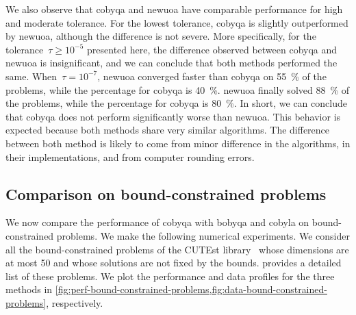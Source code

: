 We also observe that \gls{cobyqa} and \gls{newuoa} have comparable performance for high and moderate tolerance.
For the lowest tolerance, \gls{cobyqa} is slightly outperformed by \gls{newuoa}, although the difference is not severe.
More specifically, for the tolerance~$\tau \ge 10^{-5}$ presented here, the difference observed between \gls{cobyqa} and \gls{newuoa} is insignificant, and we can conclude that both methods performed the same.
When~$\tau = 10^{-7}$, \gls{newuoa} converged faster than \gls{cobyqa} on \SI{55}{\percent} of the problems, while the percentage for \gls{cobyqa} is \SI{40}{\percent}.
\Gls{newuoa} finally solved \SI{88}{\percent} of the problems, while the percentage for \gls{cobyqa} is \SI{80}{\percent}.
In short, we can conclude that \gls{cobyqa} does not perform significantly worse than \gls{newuoa}.
This behavior is expected because both methods share very similar algorithms.
The difference between both method is likely to come from minor difference in the algorithms, in their implementations, and from computer rounding errors.

\subsection{Comparison on bound-constrained problems}

We now compare the performance of \gls{cobyqa} with \gls{bobyqa} and \gls{cobyla} on bound-constrained problems.
We make the following numerical experiments.
We consider all the bound-constrained problems of the CUTEst library~\cite{Gould_Orban_Toint_2015} whose dimensions are at most \num{50} and whose solutions are not fixed by the bounds.
 provides a detailed list of these problems.
We plot the performance and data profiles for the three methods in \cref{fig:perf-bound-constrained-problems,fig:data-bound-constrained-problems}, respectively.

